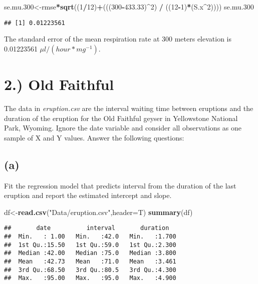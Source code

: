 \documentclass[]{article}
\newenvironment{Shaded}{\begin{snugshade}}{\end{snugshade}}
\newcommand{\KeywordTok}[1]{\textcolor[rgb]{0.13,0.29,0.53}{\textbf{#1}}}
\newcommand{\DataTypeTok}[1]{\textcolor[rgb]{0.13,0.29,0.53}{#1}}
\newcommand{\DecValTok}[1]{\textcolor[rgb]{0.00,0.00,0.81}{#1}}
\newcommand{\FloatTok}[1]{\textcolor[rgb]{0.00,0.00,0.81}{#1}}
\newcommand{\StringTok}[1]{\textcolor[rgb]{0.31,0.60,0.02}{#1}}
\newcommand{\OperatorTok}[1]{\textcolor[rgb]{0.81,0.36,0.00}{\textbf{#1}}}
\newcommand{\NormalTok}[1]{#1}
\begin{document}
\begin{Shaded}
\begin{Highlighting}[]
\NormalTok{se.mu.}\DecValTok{300}\NormalTok{<-rmse}\OperatorTok{*}\KeywordTok{sqrt}\NormalTok{((}\DecValTok{1}\OperatorTok{/}\DecValTok{12}\NormalTok{)}\OperatorTok{+}\NormalTok{(((}\DecValTok{300}\OperatorTok{-}\FloatTok{433.33}\NormalTok{)}\OperatorTok{^}\DecValTok{2}\NormalTok{) }\OperatorTok{/}\StringTok{ }\NormalTok{((}\DecValTok{12}\OperatorTok{-}\DecValTok{1}\NormalTok{)}\OperatorTok{*}\NormalTok{(S.x}\OperatorTok{^}\DecValTok{2}\NormalTok{))))}
\NormalTok{se.mu.}\DecValTok{300}
\end{Highlighting}
\end{Shaded}

\begin{verbatim}
## [1] 0.01223561
\end{verbatim}

The standard error of the mean respiration rate at 300 meters elevation
is 0.01223561 \(\mu l/(hour*mg^{-1})\).

\section{2.) Old Faithful}\label{old-faithful}

The data in \emph{eruption.csv} are the interval waiting time between
eruptions and the duration of the eruption for the Old Faithful geyser
in Yellowstone National Park, Wyoming. Ignore the date variable and
consider all observations as one sample of X and Y values. Answer the
following questions:

\subsection{(a)}\label{a-1}

Fit the regression model that predicts interval from the duration of the
last eruption and report the estimated intercept and slope.

\begin{Shaded}
\begin{Highlighting}[]
\NormalTok{df<-}\KeywordTok{read.csv}\NormalTok{(}\StringTok{"Data/eruption.csv"}\NormalTok{,}\DataTypeTok{header=}\NormalTok{T)}
\KeywordTok{summary}\NormalTok{(df)}
\end{Highlighting}
\end{Shaded}

\begin{verbatim}
##       date          interval       duration    
##  Min.   : 1.00   Min.   :42.0   Min.   :1.700  
##  1st Qu.:15.50   1st Qu.:59.0   1st Qu.:2.300  
##  Median :42.00   Median :75.0   Median :3.800  
##  Mean   :42.73   Mean   :71.0   Mean   :3.461  
##  3rd Qu.:68.50   3rd Qu.:80.5   3rd Qu.:4.300  
##  Max.   :95.00   Max.   :95.0   Max.   :4.900
\end{verbatim}
\end{document}

